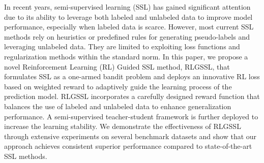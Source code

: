 In recent years, semi-supervised learning (SSL) has gained significant attention due to its ability to leverage both labeled and unlabeled data to improve model performance, especially when labeled data is scarce. 
However, most current SSL methods 
rely on heuristics or predefined rules for generating pseudo-labels and leveraging unlabeled data. 
They are limited to 
exploiting loss functions and regularization methods within the standard norm.
In this paper, we propose a novel Reinforcement Learning (RL) Guided SSL method, RLGSSL, 
that formulates SSL as a one-armed bandit problem and deploys an innovative RL loss based on weighted reward
to adaptively guide the learning process of the prediction model. 
RLGSSL incorporates a carefully designed reward function 
that balances the use of labeled and unlabeled data to enhance generalization performance. 
A semi-supervised teacher-student framework is further deployed to increase the learning stability. 
We demonstrate the effectiveness of RLGSSL through extensive experiments on several benchmark datasets 
and show that our approach achieves consistent superior performance compared to state-of-the-art SSL methods.